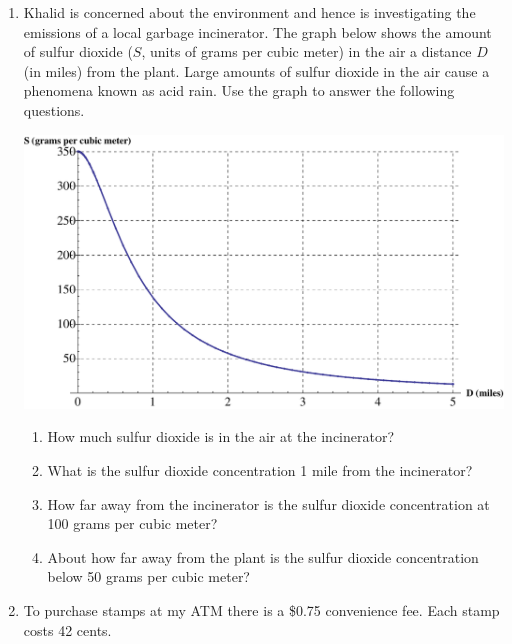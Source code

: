 \documentclass[12pt]{article}
\begin{document}
\hrulefill


\newpage

\begin{enumerate}
\item Khalid is concerned about the environment and hence is investigating the emissions of a local garbage incinerator.  The graph below shows the amount of sulfur dioxide ($S$, units of grams per cubic meter) in the air a distance $D$ (in miles) from the plant. Large amounts of sulfur dioxide in the air cause a phenomena known as acid rain. Use the graph to answer the following questions.

\begin{center}
 {\includegraphics [width = 8in] {garbageEmissions_B}}
\end{center}



\begin{enumerate}
\item How much sulfur dioxide is in the air at the incinerator?
\vfill
\item What is the sulfur dioxide concentration 1 mile from the incinerator?
\vfill
\item How far away from the incinerator is the sulfur dioxide concentration at 100 grams per cubic meter?
\vfill
\item About how far away from the plant is the sulfur dioxide concentration below 50 grams per cubic meter?
\vfill
\end{enumerate}

\newpage
\item  To purchase stamps at my ATM there is a \$0.75 convenience fee.  Each stamp costs 42 cents.   


\end{enumerate}
\end{document}
